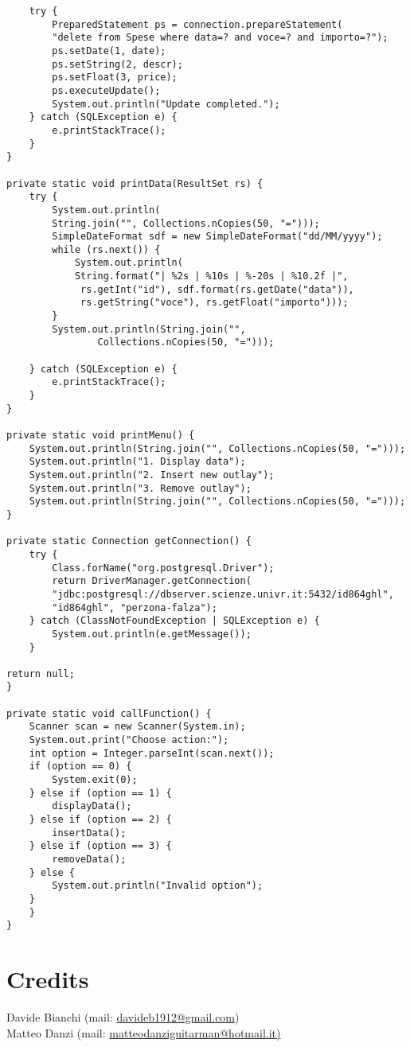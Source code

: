 \documentclass[a4paper, 10pt]{article}
\begin{document}
\begin{lstlisting}
	try {
		PreparedStatement ps = connection.prepareStatement(
		"delete from Spese where data=? and voce=? and importo=?");
		ps.setDate(1, date);
		ps.setString(2, descr);
		ps.setFloat(3, price);
		ps.executeUpdate();
		System.out.println("Update completed.");
	} catch (SQLException e) {
		e.printStackTrace();
	}
}

private static void printData(ResultSet rs) {
	try {
		System.out.println(
		String.join("", Collections.nCopies(50, "=")));
		SimpleDateFormat sdf = new SimpleDateFormat("dd/MM/yyyy");
		while (rs.next()) {
			System.out.println(
			String.format("| %2s | %10s | %-20s | %10.2f |",
			 rs.getInt("id"), sdf.format(rs.getDate("data")), 
			 rs.getString("voce"), rs.getFloat("importo")));
		}
		System.out.println(String.join("", 
				Collections.nCopies(50, "=")));
	
	} catch (SQLException e) {
		e.printStackTrace();
	}
}

private static void printMenu() {
	System.out.println(String.join("", Collections.nCopies(50, "=")));
	System.out.println("1. Display data");
	System.out.println("2. Insert new outlay");
	System.out.println("3. Remove outlay");
	System.out.println(String.join("", Collections.nCopies(50, "=")));
}

private static Connection getConnection() {
	try {
		Class.forName("org.postgresql.Driver");
		return DriverManager.getConnection(
		"jdbc:postgresql://dbserver.scienze.univr.it:5432/id864ghl",
		"id864ghl", "perzona-falza");
	} catch (ClassNotFoundException | SQLException e) {
		System.out.println(e.getMessage());
	}

return null;
}

private static void callFunction() {
	Scanner scan = new Scanner(System.in);
	System.out.print("Choose action:");
	int option = Integer.parseInt(scan.next());
	if (option == 0) {
		System.exit(0);
	} else if (option == 1) {
		displayData();
	} else if (option == 2) {
		insertData();
	} else if (option == 3) {
		removeData();
	} else {
		System.out.println("Invalid option");
	}
	}
}
\end{lstlisting}


\section{Credits}
Davide Bianchi (mail: \url{davideb1912@gmail.com}) \\
Matteo Danzi (mail: \url{matteodanziguitarman@hotmail.it)}


			
\end{document}
